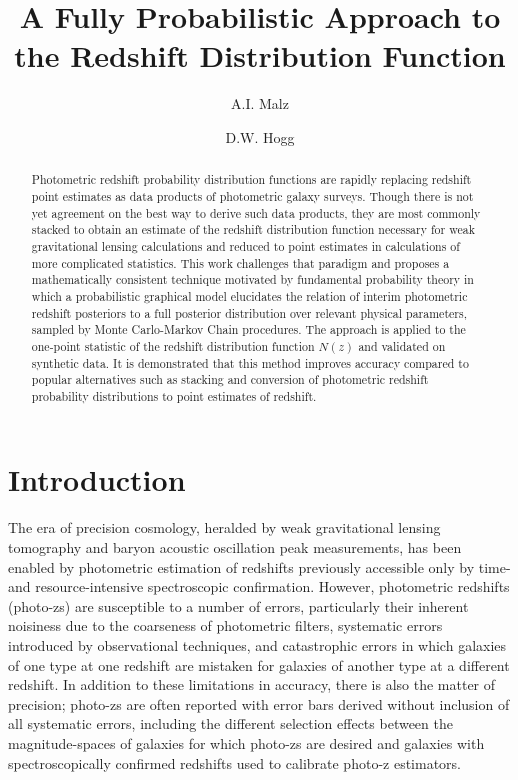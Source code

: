 \documentclass[preprint]{aastex}
\begin{document}
\title{A Fully Probabilistic Approach to the Redshift Distribution Function}

\author{A.I. Malz}

\author{D.W. Hogg}


\begin{abstract}
Photometric redshift probability distribution functions are rapidly replacing 
redshift point estimates as data products of photometric galaxy surveys.  
Though there is not yet agreement on the best way to derive such data products, 
they are most commonly stacked to obtain an estimate of the redshift 
distribution function necessary for weak gravitational lensing calculations and 
reduced to point estimates in calculations of more complicated statistics.  
This work challenges that paradigm and proposes a mathematically consistent 
technique motivated by fundamental probability theory in which a probabilistic 
graphical model elucidates the relation of interim photometric redshift 
posteriors to a full posterior distribution over relevant physical parameters, 
sampled by Monte Carlo-Markov Chain procedures.  The approach is applied to the 
one-point statistic of the redshift distribution function $N(z)$ and validated 
on synthetic data.  It is demonstrated that this method improves accuracy 
compared to popular alternatives such as stacking and conversion of photometric 
redshift probability distributions to point estimates of redshift.
\end{abstract}


\clearpage
\section{Introduction}
\label{sec:intro}

The era of precision cosmology, heralded by weak gravitational lensing 
tomography and baryon acoustic oscillation peak measurements, has been enabled 
by photometric estimation of redshifts previously accessible only by time- and 
resource-intensive spectroscopic confirmation.  However, photometric redshifts 
(photo-zs) are susceptible to a number of errors, particularly their inherent 
noisiness due to the coarseness of photometric filters, systematic errors 
introduced by observational techniques, and catastrophic errors in which 
galaxies of one type at one redshift are mistaken for galaxies of another type 
at a different redshift.  In addition to these limitations in accuracy, there 
is also the matter of precision; photo-zs are often reported with error bars 
derived without inclusion of all systematic errors, including the different 
selection effects between the magnitude-spaces of galaxies for which photo-zs 
are desired and galaxies with spectroscopically confirmed redshifts used to 
calibrate photo-z estimators.
\end{document}
